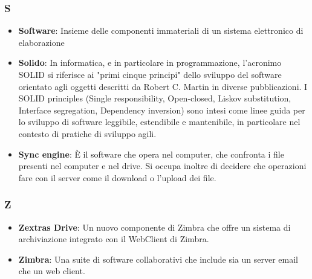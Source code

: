 \subsubsection*{S}
\begin{itemize}
    \item \textbf{Software}: Insieme delle componenti immateriali di un sistema elettronico di elaborazione
    \item \textbf{Solido}: In informatica, e in particolare in programmazione, l'acronimo SOLID si riferisce ai "primi cinque principi" dello sviluppo del software orientato agli oggetti descritti da Robert C. Martin in diverse pubblicazioni. I SOLID principles (Single responsibility, Open-closed, Liskov substitution, Interface segregation, Dependency inversion) sono intesi come linee guida per lo sviluppo di software leggibile, estendibile e mantenibile, in particolare nel contesto di pratiche di sviluppo agili.
    \item \textbf{Sync engine}: È il software che opera nel computer, che confronta i file presenti nel computer e nel drive. Si occupa inoltre di decidere che operazioni fare con il server come il download o l'upload dei file.
\end{itemize}

\subsubsection*{Z}
\begin{itemize}
    \item \textbf{Zextras Drive}: Un nuovo componente di Zimbra che offre un sistema di archiviazione integrato con il WebClient di Zimbra. 
    \item \textbf{Zimbra}: Una suite di software collaborativi che include sia un server email che un web client.
\end{itemize}